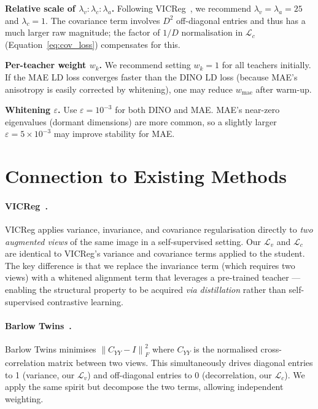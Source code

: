 \documentclass[11pt,a4paper]{article}
\newcommand{\calL}{\mathcal{L}}
\newcommand{\norm}[1]{\left\|#1\right\|}
\begin{document}
\textbf{Relative scale of $\lambda_v : \lambda_c : \lambda_a$.}
Following VICReg~\citep{bardes2022vicreg}, we recommend $\lambda_v = \lambda_a =
25$ and $\lambda_c = 1$.  The covariance term involves $D^2$ off-diagonal entries
and thus has a much larger raw magnitude; the factor of $1/D$ normalisation in
$\calL_c$ (Equation~\eqref{eq:cov_loss}) compensates for this.

\textbf{Per-teacher weight $w_k$.}
We recommend setting $w_k = 1$ for all teachers initially.  If the MAE LD loss
converges faster than the DINO LD loss (because MAE's anisotropy is easily
corrected by whitening), one may reduce $w_{\mathrm{mae}}$ after warm-up.

\textbf{Whitening $\varepsilon$.}
Use $\varepsilon = 10^{-3}$ for both DINO and MAE.  MAE's near-zero eigenvalues
(dormant dimensions) are more common, so a slightly larger $\varepsilon =
5 \times 10^{-3}$ may improve stability for MAE.

\section{Connection to Existing Methods}
\label{sec:related}

\paragraph{VICReg~\citep{bardes2022vicreg}.}
VICReg applies variance, invariance, and covariance regularisation directly to
\emph{two augmented views} of the same image in a self-supervised setting.
Our $\calL_v$ and $\calL_c$ are identical to VICReg's variance and covariance
terms applied to the student.  The key difference is that we replace the
invariance term (which requires two views) with a whitened alignment term that
leverages a pre-trained teacher — enabling the structural property to be
acquired \emph{via distillation} rather than self-supervised contrastive
learning.

\paragraph{Barlow Twins~\citep{zbontar2021barlow}.}
Barlow Twins minimises $\norm{C_{YY} - I}_F^2$ where $C_{YY}$ is the
normalised cross-correlation matrix between two views.
This simultaneously drives diagonal entries to 1 (variance, our $\calL_v$)
and off-diagonal entries to 0 (decorrelation, our $\calL_c$).
We apply the same spirit but decompose the two terms, allowing independent
weighting.
\end{document}
